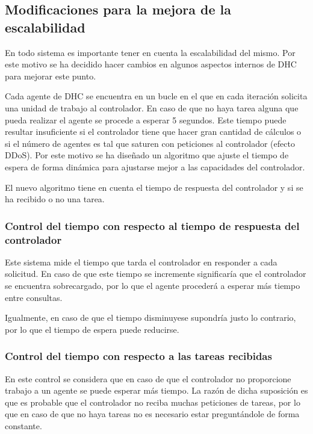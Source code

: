 \subsection{Modificaciones para la mejora de la escalabilidad}

En todo sistema es importante tener en cuenta la escalabilidad del mismo. Por este motivo se ha decidido hacer cambios en algunos aspectos internos de DHC para mejorar este punto.

Cada agente de DHC se encuentra en un bucle en el que en cada iteración solicita una unidad de trabajo al controlador. En caso de que no haya tarea alguna que pueda realizar el agente se procede a esperar 5 segundos. Este tiempo puede resultar insuficiente si el controlador tiene que hacer gran cantidad de cálculos o si el número de agentes es tal que saturen con peticiones al controlador (efecto DDoS). Por este motivo se ha diseñado un algoritmo que ajuste el tiempo de espera de forma dinámica para ajustarse mejor a las capacidades del controlador.

El nuevo algoritmo tiene en cuenta el tiempo de respuesta del controlador y si se ha recibido o no una tarea.

\subsubsection{Control del tiempo con respecto al tiempo de respuesta del controlador}

Este sistema mide el tiempo que tarda el controlador en responder a cada solicitud. En caso de que este tiempo se incremente significaría que el controlador se encuentra sobrecargado, por lo que el agente procederá a esperar más tiempo entre consultas.

Igualmente, en caso de que el tiempo disminuyese supondría justo lo contrario, por lo que el tiempo de espera puede reducirse.

\subsubsection{Control del tiempo con respecto a las tareas recibidas}

En este control se considera que en caso de que el controlador no proporcione trabajo a un agente se puede esperar más tiempo. La razón de dicha suposición es que es probable que el controlador no reciba muchas peticiones de tareas, por lo que en caso de que no haya tareas no es necesario estar preguntándole de forma constante.

